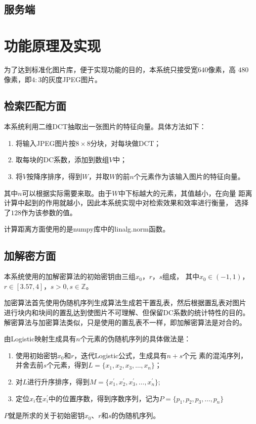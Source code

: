 \documentclass[12pt, titlepage]{ctexrep}
\begin{document}
\subsection{服务端}

\section{功能原理及实现}
\label{sec:func-impl}

为了达到标准化图片库，便于实现功能的目的，本系统只接受宽$640$像素，高
$480$像素，即$4:3$的灰度JPEG图片。

\subsection{检索匹配方面}
\label{sec:retrieval-impl}
本系统利用二维DCT抽取出一张图片的特征向量。具体方法如下：
\begin{enumerate}
\item 将输入JPEG图片按$8 \times 8$分块，对每块做DCT；
\item 取每块的DC系数，添加到数组$V$中；
\item 将$V$按降序排序，得到$W$，并取$W$的前$n$个元素作为该输入图片的特征向量。
\end{enumerate}

其中$n$可以根据实际需要来取。由于$W$中下标越大的元素，其值越小，在向量
距离计算中起到的作用就越小，因此本系统实现中对检索效果和效率进行衡量，
选择了$128$作为该参数的值。

计算距离方面使用的是numpy库中的linalg.norm函数。

\subsection{加解密方面}
\label{sec:enc-dec-impl}

本系统使用的加解密算法的初始密钥由三组$x_0$，$r$，$s$组成，
其中$x_0 \in (-1, 1)$，$r \in [3.57, 4]$，$s > 0, s \in \mathbb{Z}$。

加密算法首先使用伪随机序列生成算法生成若干置乱表，然后根据置乱表对图片
进行块内和块间的置乱达到使图片不可理解、但保留DC系数的统计特性的目的。
解密算法与加密算法类似，只是使用的置乱表不一样，即加解密算法是对合的。

由Logistic映射生成具有$n$个元素的伪随机序列的具体做法\cite{lu2007}是：
\begin{enumerate}
  \item 使用初始密钥$x_0$和$r$，迭代Logistic公式，生成具有$n + s$个元
      素的混沌序列，并舍去前$s$个元素，得到$L = \{x_1, x_2, x_3, \dotsc, x_n\}$；
  \item 对$L$进行升序排序，得到$M = \{x_1^\prime, x_2^\prime, x_3^\prime,
      \dotsc, x_n^\prime\}$;
  \item 定位$x_i$在$x_i^\prime$中的位置序数，得到序数序列，记为$P =
      \{p_1, p_2, p_3, \dotsc, p_n\}$
\end{enumerate}
$P$就是所求的关于初始密钥$x_0$、$r$和$s$的伪随机序列。
\end{document}
